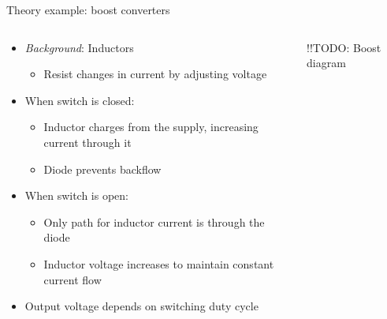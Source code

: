 \documentclass{beamer}
\begin{document}
\begin{frame}{Theory example: boost converters}
  \begin{columns}[T]
    \begin{column}{.6\textwidth}
      \begin{itemize}
        \item {\em Background}: Inductors
        \begin{itemize}
          \item Resist changes in current by adjusting voltage
        \end{itemize}
        \item When switch is closed:
        \begin{itemize}
          \item Inductor charges from the supply, increasing current through it
          \item Diode prevents backflow
        \end{itemize}
        \item When switch is open:
        \begin{itemize}
          \item Only path for inductor current is through the diode
          \item Inductor voltage increases to maintain constant current flow
        \end{itemize}
        \item Output voltage depends on switching duty cycle
      \end{itemize}
    \end{column}

    \begin{column}{0.4\textwidth}
      !!TODO: Boost diagram
    \end{column}
  \end{columns}
\end{frame}
\end{document}
